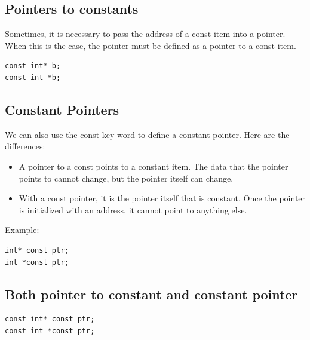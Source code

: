 \documentclass{report}
\begin{document}
    \bigbreak \noindent 
    \subsection{Pointers to constants}
    \bigbreak \noindent 
    Sometimes, it is necessary to pass the address of a const item into a pointer. When this is the case, the pointer must be defined as a pointer to a const item.
    \bigbreak \noindent 
    \sepline
    \begin{verbatim}
const int* b; 
const int *b;
    \end{verbatim}
    \sepline
    \bigbreak \noindent 
    \bigbreak \noindent 

    \pagebreak \bigbreak \noindent 
    \subsection{Constant Pointers}
    \bigbreak \noindent 
    We can also use the const key word to define a constant pointer. Here are the differences:
    \begin{itemize}
        \item A pointer to a const points to a constant item. The data that the pointer points to cannot change, but the pointer itself can change. 
        \item With a const pointer, it is the pointer itself that is constant.  Once the pointer is initialized with an address, it cannot point to anything else.
    \end{itemize}
    \bigbreak \noindent 
    Example:
    \bigbreak \noindent 
    \sepline
    \begin{verbatim}
int* const ptr;
int *const ptr;
    \end{verbatim}
    \sepline

    \bigbreak \noindent 
    \subsection{Both pointer to constant and constant pointer}
    \bigbreak \noindent 
    \sepline
    \begin{verbatim}
const int* const ptr;
const int *const ptr;
    \end{verbatim}
    \sepline
\end{document}
